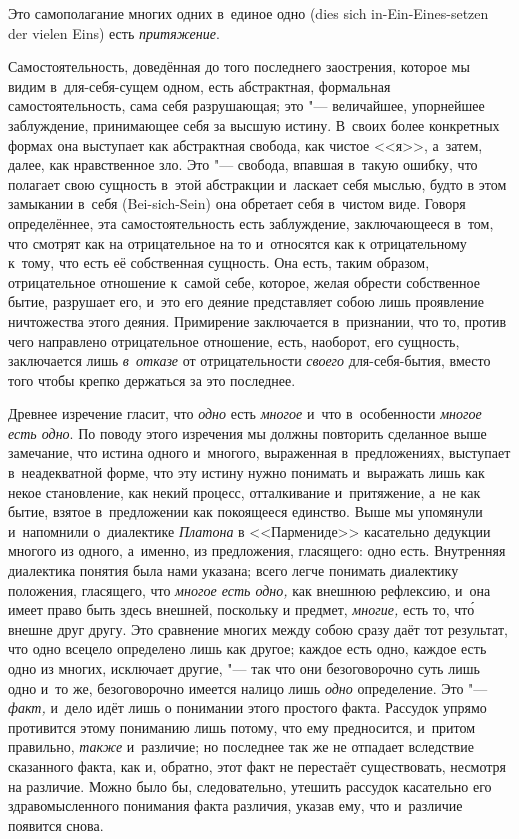 Это самополагание многих одних в~единое одно (dies sich
in-Ein-Eines-setzen der vielen Eins) есть {\em притяжение}.


Самостоятельность, доведённая до того последнего заострения, которое мы
видим в~для-себя-сущем одном, есть абстрактная, формальная
самостоятельность, сама себя разрушающая; это "--- величайшее, упорнейшее
заблуждение, принимающее себя за высшую истину. В~своих более конкретных
формах она выступает как абстрактная свобода, как чистое <<я>>, а~затем,
далее, как нравственное зло. Это "--- свобода, впавшая в~такую ошибку, что
полагает свою сущность в~этой абстракции и~ласкает себя мыслью, будто в
этом замыкании в~себя (Bei-sich-Sein) она обретает себя в~чистом виде.
Говоря определённее, эта самостоятельность есть заблуждение, заключающееся
в~том, что смотрят как на отрицательное на то и~относятся как к
отрицательному к~тому, что есть её собственная сущность. Она есть, таким
образом, отрицательное отношение к~самой себе, которое, желая обрести
собственное бытие, разрушает его, и~это его деяние представляет собою лишь
проявление ничтожества этого деяния. Примирение заключается в~признании,
что то, против чего направлено отрицательное отношение, есть, наоборот, его
сущность, заключается лишь {\em в~отказе} от
отрицательности {\em своего} для-себя-бытия, вместо
того чтобы крепко держаться за это последнее.

Древнее изречение гласит, что {\em одно} есть
{\em многое} и~что в~особенности
{\em многое есть одно}. По поводу этого изречения мы
должны повторить сделанное выше замечание, что истина одного и~многого,
выраженная в~предложениях, выступает в~неадекватной форме, что эту истину
нужно понимать и~выражать лишь как некое становление, как некий процесс,
отталкивание и~притяжение, а~не как бытие, взятое в~предложении как
покоящееся единство. Выше мы упомянули и~напомнили о~диалектике
{\em Платона} в <<Пармениде>> касательно дедукции многого
из одного, а~именно, из предложения, гласящего: одно есть. Внутренняя
диалектика понятия была нами указана; всего легче понимать диалектику
положения, гласящего, что {\em многое есть одно,} как
внешнюю рефлексию, и~она имеет право быть здесь внешней, поскольку и
предмет, {\em многие,} есть то, чт\'{о} внешне друг другу.
Это сравнение многих между собою сразу даёт тот результат, что одно всецело
определено лишь как другое; каждое есть одно, каждое есть одно из многих,
исключает другие, "--- так что они безоговорочно суть лишь одно и~то же,
безоговорочно имеется налицо лишь {\em одно}
определение. Это "--- {\em факт,} и~дело идёт лишь о
понимании этого простого факта. Рассудок упрямо противится этому пониманию
лишь потому, что ему предносится, и~притом правильно,
{\em также} и~различие; но последнее так же не отпадает
вследствие сказанного факта, как и, обратно, этот факт не перестаёт
существовать, несмотря на различие. Можно было бы, следовательно, утешить
рассудок касательно его здравомысленного понимания факта различия, указав
ему, что и~различие появится снова.

